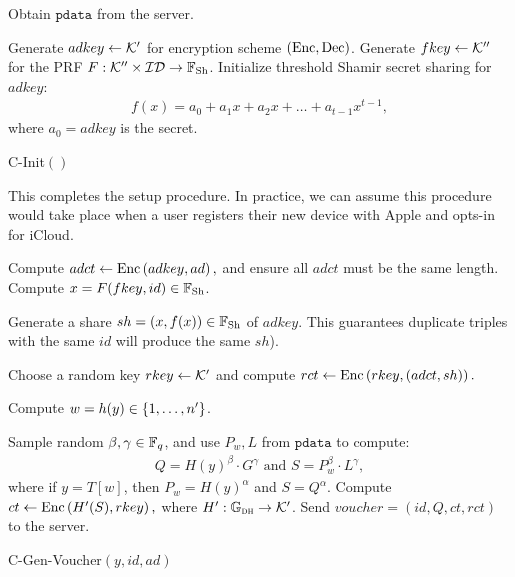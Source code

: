 \begin{algorithm}[H]
\DontPrintSemicolon
     Obtain $\texttt{pdata}$ from the server.\;

       Generate $adkey \gets \mathcal{K}'$ for  encryption scheme $\left(\text{Enc}, \text{Dec}\right)$.\;
       Generate $fkey \gets \mathcal{K}''$ for the PRF $F: \mathcal{K}'' \times \mathcal{ID} \to \mathbb{F}_{\text{Sh}}$.\;
       Initialize threshold {Shamir secret sharing} for $adkey$:
      \begin{align*}
      f(x) = a_0 + a_1x + a_2x + \dots + a_{t-1}x^{t-1},
      \end{align*}
      where $a_0 = adkey$ is the secret.\;

\caption{  {\sf C-Init}$()$}
\label{algo:c_init}
\end{algorithm}
This completes the setup procedure. In practice, we can assume this procedure would take place when a user registers their new device with Apple and opts-in for iCloud.

\begin{algorithm}[H]
\DontPrintSemicolon
      Compute
        $
               adct \gets \text{Enc} \left(adkey, ad\right),
        $        
        and ensure all $adct$ must be the same length.\;
      Compute $x = F(fkey, id) \in \mathbb{F}_{\text{Sh}}$.\;

      Generate a share $sh = \left(x, f(x)\right) \in \mathbb{F}_{\text{Sh}}$ of $adkey$. This guarantees duplicate triples with the same $id$ will produce the same $sh$).\;

      Choose a random key $rkey \gets \mathcal{K}'$ and compute 
      $
      rct \gets \text{Enc} \left(rkey, \left(adct, sh\right)\right). 
      $

      Compute $w = h(y) \in \left\{1,\dots,n'\right\}$.\;

      Sample random  $\beta, \gamma \in \mathbb{F}_q$, and use $P_w,L$ from $\texttt{pdata}$ to compute:
     \begin{align*}
     Q = H(y)^{\beta} \cdot G^{\gamma} \text{ and } S = P_w^{\beta} \cdot L^{\gamma},
     \end{align*}
     where if $y = T[w]$, then $P_w = H(y)^{\alpha}$ and $S = Q^{\alpha}$. \label{alg_step:dhsr} \;
   Compute $ct \gets \text{Enc} \left(H'(S), rkey\right),$ where $H' : \mathbb{G}_{\textsc{dh}} \to \mathcal{K}'$.\;
      Send $voucher = (id, Q, ct, rct)$ to the server.\;


\caption{  {\sf C-Gen-Voucher}$(y, id, ad)$}
\label{algo:c_gen_voucher}
\end{algorithm}

